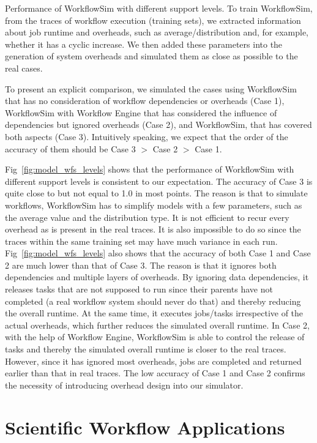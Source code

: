 Performance of WorkflowSim with different support levels. 
To train WorkflowSim, from the traces of workflow execution (training sets), we extracted information about job runtime and overheads, such as average/distribution and, for example, whether it has a cyclic increase. We then added these parameters into the generation of system overheads and simulated them as close as possible to the real cases. 

To present an explicit comparison, we simulated the cases using WorkflowSim that has no consideration of workflow dependencies or overheads (Case 1), WorkflowSim with Workflow Engine that has considered the influence of dependencies but ignored overheads (Case 2), and WorkflowSim, that has covered both aspects (Case 3). Intuitively speaking, we expect that the order of the accuracy of them should be Case 3 $>$ Case 2 $>$ Case 1. 

Fig~\ref{fig:model_wfs_levels} shows that the performance of WorkflowSim with different support levels is consistent to our expectation. The accuracy of Case 3 is quite close to but not equal to 1.0 in most points. The reason is that to simulate workflows, WorkflowSim has to simplify models with a few parameters, such as the average value and the distribution type. It is not efficient to recur every overhead as is present in the real traces. It is also impossible to do so since the traces within the same training set may have much variance in each run. Fig~\ref{fig:model_wfs_levels} also shows that the accuracy of both Case 1 and Case 2 are much lower than that of Case 3. The reason is that it ignores both dependencies and multiple layers of overheads. By ignoring data dependencies, it releases tasks that are not supposed to run since their parents have not completed (a real workflow system should never do that) and thereby reducing the overall runtime. At the same time, it executes jobs/tasks irrespective of the actual overheads, which further reduces the simulated overall runtime. In Case 2, with the help of Workflow Engine, WorkflowSim is able to control the release of tasks and thereby the simulated overall runtime is closer to the real traces. However, since it has ignored most overheads, jobs are completed and returned earlier than that in real traces. The low accuracy of Case 1 and Case 2 confirms the necessity of introducing overhead design into our simulator. 

\section{Scientific Workflow Applications}
\label{sec:applications}

